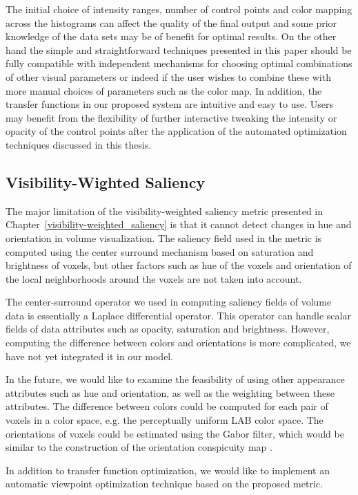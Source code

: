The initial choice of intensity ranges, number of control points and color mapping across the histograms can affect the quality of the final output and some prior knowledge of the data sets may be of benefit for optimal results. On the other hand the simple and straightforward techniques presented in this paper should be fully compatible with independent mechanisms for choosing optimal combinations of other visual parameters or indeed if the user wishes to combine these with more manual choices of parameters such as the color map.
In addition, the transfer functions in our proposed system are intuitive and easy to use. Users may benefit from the flexibility of further interactive tweaking the intensity or opacity of the control points after the application of the automated optimization techniques discussed in this thesis.

\subsection{Visibility-Wighted Saliency}
The major limitation of the visibility-weighted saliency metric presented in Chapter~\ref{visibility-weighted_saliency} is that it cannot detect changes in hue and orientation in volume visualization. The saliency field used in the metric is computed using the center surround mechanism based on saturation and brightness of voxels, but other factors such as hue of the voxels and orientation of the local neighborhoods around the voxels are not taken into account.

The center-surround operator \cite{kim_saliency-guided_2006} we used in computing saliency fields of volume data is essentially a Laplace differential operator. This operator can handle scalar fields of data attributes such as opacity, saturation and brightness. However, computing the difference between colors and orientations is more complicated, we have not yet integrated it in our model.

In the future, we would like to examine the feasibility of using other appearance attributes such as hue and orientation, as well as the weighting between these attributes. The difference between colors could be computed for each pair of voxels in a color space, e.g. the perceptually uniform LAB color space. The orientations of voxels could be estimated using the Gabor filter, which would be similar to the construction of the orientation conspicuity map \cite{itti_model_1998}.

In addition to transfer function optimization, we would like to implement an automatic viewpoint optimization technique based on the proposed metric.

